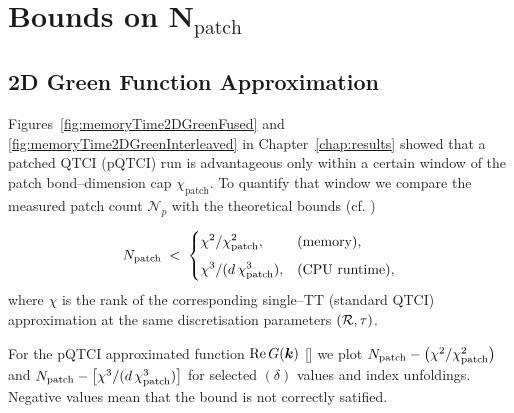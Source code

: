 \chapter{Bounds on \(\mathbf{N}_{\text{patch}}\)}
\label{app:bounds}
\section{2D Green Function Approximation}
\label{app:2DGreenbounds}

Figures~\ref{fig:memoryTime2DGreenFused} and
\ref{fig:memoryTime2DGreenInterleaved} in
Chapter~\ref{chap:results} showed that a patched QTCI (pQTCI) run is advantageous only within a certain window of the patch bond–dimension cap
\(\chi_{\text{patch}}\).   To quantify that window we compare the measured patch count \(\mathcal
N_{\!p}\) with the theoretical bounds (cf. ) 

\begin{equation}
    N_{\text{patch}}
    \;<\;
    \begin{cases}
      \displaystyle\chi^{2}/\chi_{\text{patch}}^{2}, & \text{(memory)},\\[6pt]
      \displaystyle\chi^{3}/(d\,\chi_{\text{patch}}^{3}), & \text{(CPU runtime)},
    \end{cases}
  \label{eq:chiPatchBoundApp}
\end{equation}
where \(\chi\) is the rank of the corresponding single–TT (standard QTCI)
approximation at the same discretisation parameters \((\mathcal{R},\tau)\).

For the pQTCI approximated function \(\operatorname{Re}G(\boldsymbol{k})\) [] we plot \(N_{\text{patch}}-\bigl(\chi^{2}/\chi_{\text{patch}}^{2}\bigr)\) and
\(N_{\text{patch}}-\bigl[\chi^{3}/(d\,\chi_{\text{patch}}^{3})\bigr]\) for
selected \((\delta)\) values and index unfoldings.   Negative values mean that the bound is not correctly satified.

